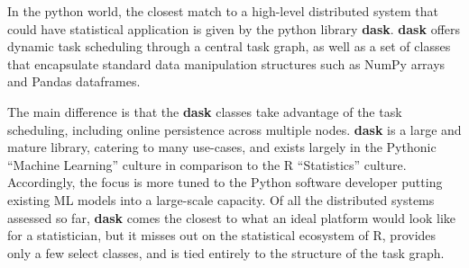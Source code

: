 In the python world, the closest match to a high-level distributed
system that could have statistical application is given by the python
library \textbf{dask}\cite{rocklin2015dask}. \textbf{dask} offers
dynamic task scheduling through a central task graph, as well as a set
of classes that encapsulate standard data manipulation structures such
as NumPy arrays and Pandas dataframes.

The main difference is that the \textbf{dask} classes take advantage of
the task scheduling, including online persistence across multiple nodes.
\textbf{dask} is a large and mature library, catering to many use-cases,
and exists largely in the Pythonic ``Machine Learning'' culture in
comparison to the R ``Statistics'' culture. Accordingly, the focus is
more tuned to the Python software developer putting existing ML models
into a large-scale capacity. Of all the distributed systems assessed so
far, \textbf{dask} comes the closest to what an ideal platform would
look like for a statistician, but it misses out on the statistical
ecosystem of R, provides only a few select classes, and is tied entirely
to the structure of the task graph.
